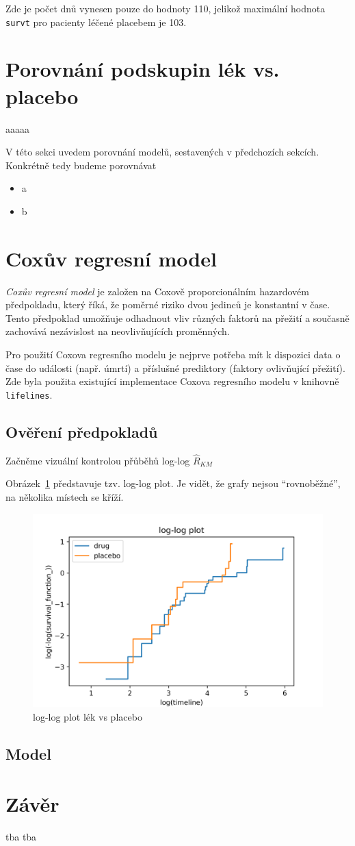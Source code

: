 \documentclass[a4, 11pt]{article}
\newcommand{\uvoz}[1]{``{#1}''}                        %
\theoremstyle{definition}
\theoremstyle{remark}
\begin{document}
	Zde je počet dnů vynesen pouze do hodnoty 110, jelikož maximální hodnota \texttt{survt} pro pacienty léčené placebem je 103.
	
	
	\section{Porovnání podskupin lék vs. placebo} \label{sec:comparison_drug_vs_placebo}
	aaaaa
	
	V této sekci uvedem porovnání modelů, sestavených v předchozích sekcích. Konkrétně tedy budeme porovnávat 
	\begin{itemize}
		\item a
		\item b
	\end{itemize}

	
	
	\newpage
	\section{Coxův regresní model} \label{sec:cox_model}
	\textit{Coxův regresní model} je založen na Coxově proporcionálním hazardovém předpokladu, který říká, že poměrné riziko dvou jedinců je konstantní v čase. Tento předpoklad umožňuje odhadnout vliv různých faktorů na přežití a současně zachovává nezávislost na neovlivňujících proměnných.
	
	Pro použití Coxova regresního modelu je nejprve potřeba mít k dispozici data o čase do události (např. úmrtí) a příslušné prediktory (faktory ovlivňující přežití). Zde byla použita existující implementace Coxova regresního modelu v knihovně \texttt{lifelines}.
	
	\subsection{Ověření předpokladů}
	Začněme vizuální kontrolou přůběhů log-log $ \hat{R}_{KM} $ 
	 
	Obrázek~\ref{fig:loglogplot_drug_vs_placebo} představuje tzv. log-log plot. Je vidět, že grafy nejsou \uvoz{rovnoběžné}, na několika místech se kříží. 
	 
	 \begin{figure}[H]
	 	\centering
	 	\includegraphics[width=0.6\linewidth]{img/loglogplot_KM.png}
	 	\caption{log-log plot lék vs placebo}
	 	\label{fig:loglogplot_drug_vs_placebo}
	 \end{figure}
	

	\subsection{Model}
	
	\newpage
	\section{Závěr}\label{sec:zaver}
	tba tba
\end{document}
